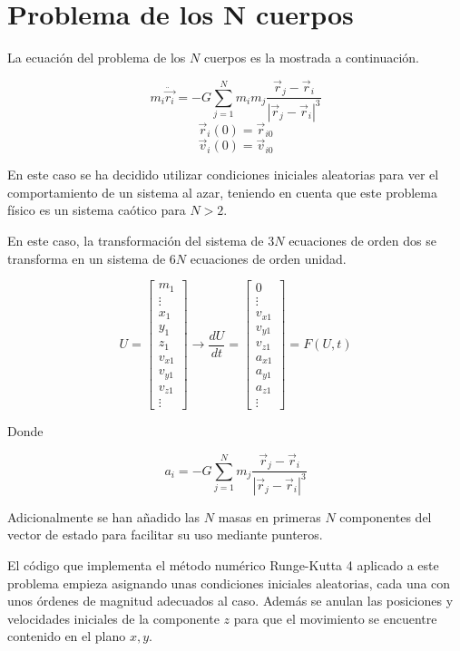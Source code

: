 \documentclass{article}
\begin{document}
	\section{Problema de los N cuerpos}
	
	La ecuación del problema de los $N$ cuerpos es la mostrada a continuación.
	
	$$m_i \ddot{\vec{r_i}}=-G\sum_{j=1}^{N}m_im_j\frac{\vec{r}_j-\vec{r}_i}{|\vec{r}_j-\vec{r}_i|^3}$$
	$$\vec{r}_i(0)=\vec{r}_{i0}$$
	$$\vec{v}_i(0)=\vec{v}_{i0}$$
	
	En este caso se ha decidido utilizar condiciones iniciales aleatorias para ver el comportamiento de un sistema al azar, teniendo en cuenta que este problema físico es un sistema caótico para $N>2$.
	
	En este caso, la transformación del sistema de $3N$ ecuaciones de orden dos se transforma en un sistema de $6N$ ecuaciones de orden unidad.
	
	\[
	U=\left[\begin{array}{c}
	m_{1}\\
	\vdots\\
	x_{1}\\
	y_{1}\\
	z_{1}\\
	v_{x1}\\
	v_{y1}\\
	v_{z1}\\
	\vdots
	\end{array}\right]\rightarrow\frac{dU}{dt}=\left[\begin{array}{c}
	0\\
	\vdots\\
	v_{x1}\\
	v_{y1}\\
	v_{z1}\\
	a_{x1}\\
	a_{y1}\\
	a_{z1}\\
	\vdots
	\end{array}\right]=F(U,t)
	\]
	
	\begin{center}
		Donde
	\end{center}
	$$a_i=-G\sum_{j=1}^{N}m_j\frac{\vec{r}_j-\vec{r}_i}{|\vec{r}_j-\vec{r}_i|^3}$$
	
	Adicionalmente se han añadido las $N$ masas en primeras $N$ componentes del vector de estado para facilitar su uso mediante punteros.
	
	El código que implementa el método numérico Runge-Kutta 4 aplicado a este problema empieza asignando unas condiciones iniciales aleatorias, cada una con unos órdenes de magnitud adecuados al caso. Además se anulan las posiciones y velocidades iniciales de la componente $z$ para que el movimiento se encuentre contenido en el plano $x,y$.
	
\end{document}

